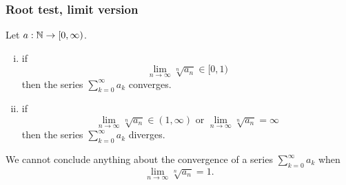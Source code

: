 \subsubsection*{Root test, limit version}
\ucol Let $a : \mathbb{N} \to [0, \infty)$.
\begin{enumerate}[(i)]
    \item if \[
            \lim_{n \to \infty} \sqrt[n]{a_n} \in [0,1)
        \] then the series $\sum_{k=0}^{\infty} a_k$ converges.
    \item if \[
            \lim_{n \to \infty} \sqrt[n]{a_n} \in (1,\infty) \text{ or }
            \lim_{n \to \infty} \sqrt[n]{a_n} = \infty
        \] then the series $\sum_{k=0}^{\infty} a_k$ diverges.
\end{enumerate}
\warning We cannot conclude anything about the convergence of a series
$\sum_{k=0}^{\infty} a_k$ when \[
            \lim_{n \to \infty} \sqrt[n]{a_n} = 1.
\]